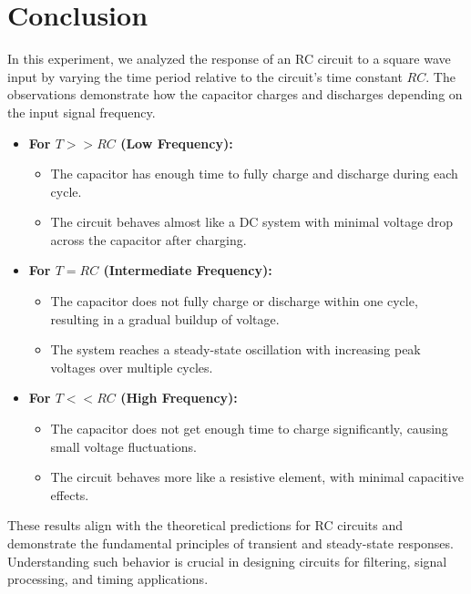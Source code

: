 \documentclass[a4paper,12pt]{article}
\begin{document}
\section{Conclusion}

In this experiment, we analyzed the response of an RC circuit to a square wave input by varying the time period relative to the circuit's time constant \( RC \). The observations demonstrate how the capacitor charges and discharges depending on the input signal frequency.

\begin{itemize}
    \item \textbf{For \( T >> RC \) (Low Frequency):}
    \begin{itemize}
        \item The capacitor has enough time to fully charge and discharge during each cycle.
        \item The circuit behaves almost like a DC system with minimal voltage drop across the capacitor after charging.
    \end{itemize}
    
    \item \textbf{For \( T = RC \) (Intermediate Frequency):}
    \begin{itemize}
        \item The capacitor does not fully charge or discharge within one cycle, resulting in a gradual buildup of voltage.
        \item The system reaches a steady-state oscillation with increasing peak voltages over multiple cycles.
    \end{itemize}
    
    \item \textbf{For \( T << RC \) (High Frequency):}
    \begin{itemize}
        \item The capacitor does not get enough time to charge significantly, causing small voltage fluctuations.
        \item The circuit behaves more like a resistive element, with minimal capacitive effects.
    \end{itemize}
\end{itemize}

These results align with the theoretical predictions for RC circuits and demonstrate the fundamental principles of transient and steady-state responses. Understanding such behavior is crucial in designing circuits for filtering, signal processing, and timing applications.
\end{document}
